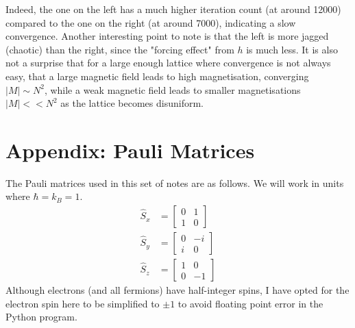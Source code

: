 \documentclass{article}
\begin{document}
Indeed, the one on the left has a much higher iteration count (at around 12000) compared to the one on the right 
(at around 7000), indicating a slow convergence. Another interesting point
 to note is that the left is more jagged (chaotic)
than the right, since the "forcing effect" from $h$ is much less. It is also not a surprise that for a large enough lattice where convergence is not always easy, that
a large magnetic field leads to high magnetisation, converging $|M| \sim  N^2$, while a weak magnetic 
field leads to smaller magnetisations $|M|<<N^2$ as the lattice becomes disuniform.
\section{Appendix: Pauli Matrices}
The Pauli matrices used in this set of notes are as follows. 
We will work in units where $\hbar=k_B=1$. 
\begin{align*}
    \hat{S}_x&=\begin{bmatrix}
        0 & 1\\ 
        1& 0
    \end{bmatrix}\\
    \hat{S}_y &= 
    \begin{bmatrix}
        0 & -i \\
        i & 0
    \end{bmatrix}\\ 
    \hat{S}_z&=\begin{bmatrix}
        1 & 0\\ 
        0 & -1
    \end{bmatrix}
\end{align*}
Although electrons (and all fermions) have half-integer spins,
I have opted for the electron spin here to be simplified to $\pm1$ to avoid floating point error in the Python program. 
\end{document}
